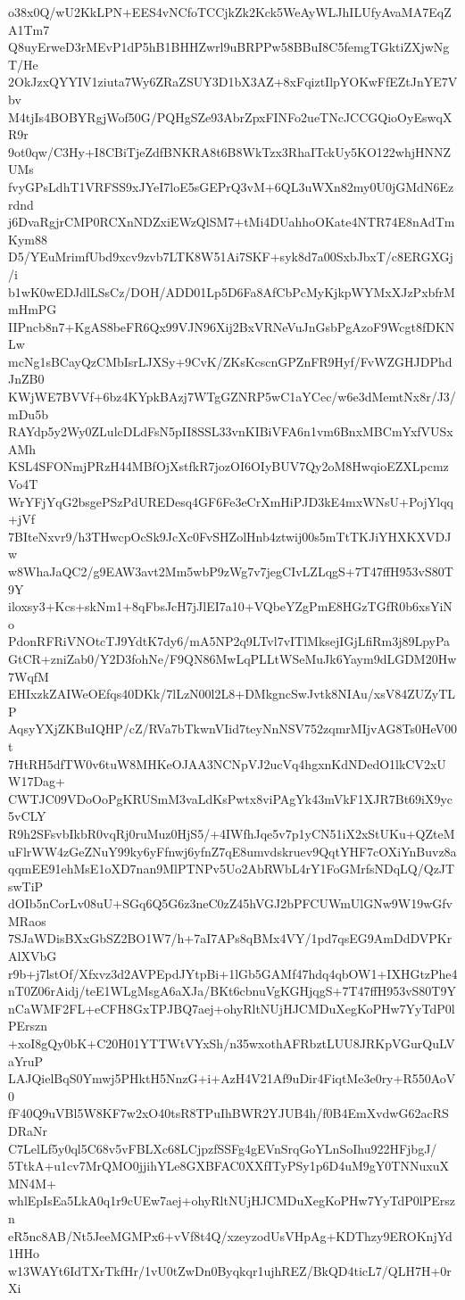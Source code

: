 o38x0Q/wU2KkLPN+EES4vNCfoTCCjkZk2Kck5WeAyWLJhILUfyAvaMA7EqZA1Tm7
Q8uyErweD3rMEvP1dP5hB1BHHZwrl9uBRPPw58BBuI8C5femgTGktiZXjwNgT/He
2OkJzxQYYIV1ziuta7Wy6ZRaZSUY3D1bX3AZ+8xFqiztIlpYOKwFfEZtJnYE7Vbv
M4tjIs4BOBYRgjWof50G/PQHgSZe93AbrZpxFINFo2ueTNcJCCGQioOyEswqXR9r
9ot0qw/C3Hy+I8CBiTjeZdfBNKRA8t6B8WkTzx3RhaITckUy5KO122whjHNNZUMs
fvyGPsLdhT1VRFSS9xJYeI7loE5sGEPrQ3vM+6QL3uWXn82my0U0jGMdN6Ezrdnd
j6DvaRgjrCMP0RCXnNDZxiEWzQlSM7+tMi4DUahhoOKate4NTR74E8nAdTmKym88
D5/YEuMrimfUbd9xcv9zvb7LTK8W51Ai7SKF+syk8d7a00SxbJbxT/c8ERGXGj/i
b1wK0wEDJdlLSsCz/DOH/ADD01Lp5D6Fa8AfCbPcMyKjkpWYMxXJzPxbfrMmHmPG
IIPncb8n7+KgAS8beFR6Qx99VJN96Xij2BxVRNeVuJnGsbPgAzoF9Wcgt8fDKNLw
mcNg1sBCayQzCMbIsrLJXSy+9CvK/ZKsKcscnGPZnFR9Hyf/FvWZGHJDPhdJnZB0
KWjWE7BVVf+6bz4KYpkBAzj7WTgGZNRP5wC1aYCec/w6e3dMemtNx8r/J3/mDu5b
RAYdp5y2Wy0ZLulcDLdFsN5pII8SSL33vnKIBiVFA6n1vm6BnxMBCmYxfVUSxAMh
KSL4SFONmjPRzH44MBfOjXstfkR7jozOI6OIyBUV7Qy2oM8HwqioEZXLpcmzVo4T
WrYFjYqG2bsgePSzPdUREDesq4GF6Fe3eCrXmHiPJD3kE4mxWNsU+PojYlqq+jVf
7BIteNxvr9/h3THwcpOcSk9JcXc0FvSHZolHnb4ztwij00s5mTtTKJiYHXKXVDJw
w8WhaJaQC2/g9EAW3avt2Mm5wbP9zWg7v7jegCIvLZLqgS+7T47ffH953vS80T9Y
iloxsy3+Kcs+skNm1+8qFbsJcH7jJlEI7a10+VQbeYZgPmE8HGzTGfR0b6xsYiNo
PdonRFRiVNOtcTJ9YdtK7dy6/mA5NP2q9LTvl7vITlMksejIGjLfiRm3j89LpyPa
GtCR+zniZab0/Y2D3fohNe/F9QN86MwLqPLLtWSeMuJk6Yaym9dLGDM20Hw7WqfM
EHIxzkZAIWeOEfqs40DKk/7lLzN00l2L8+DMkgncSwJvtk8NIAu/xsV84ZUZyTLP
AqsyYXjZKBuIQHP/cZ/RVa7bTkwnVIid7teyNnNSV752zqmrMIjvAG8Ts0HeV00t
7HtRH5dfTW0v6tuW8MHKeOJAA3NCNpVJ2ucVq4hgxnKdNDedO1lkCV2xUW17Dag+
CWTJC09VDoOoPgKRUSmM3vaLdKsPwtx8viPAgYk43mVkF1XJR7Bt69iX9yc5vCLY
R9h2SFsvbIkbR0vqRj0ruMuz0HjS5/+4IWfhJqe5v7p1yCN51iX2xStUKu+QZteM
uFlrWW4zGeZNuY99ky6yFfnwj6yfnZ7qE8umvdskruev9QqtYHF7cOXiYnBuvz8a
qqmEE91ehMsE1oXD7nan9MlPTNPv5Uo2AbRWbL4rY1FoGMrfsNDqLQ/QzJTswTiP
dOIb5nCorLv08uU+SGq6Q5G6z3neC0zZ45hVGJ2bPFCUWmUlGNw9W19wGfvMRaos
7SJaWDisBXxGbSZ2BO1W7/h+7aI7APs8qBMx4VY/1pd7qsEG9AmDdDVPKrAlXVbG
r9b+j7lstOf/Xfxvz3d2AVPEpdJYtpBi+1lGb5GAMf47hdq4qbOW1+IXHGtzPhe4
nT0Z06rAidj/teE1WLgMsgA6aXJa/BKt6cbnuVgKGHjqgS+7T47ffH953vS80T9Y
nCaWMF2FL+eCFH8GxTPJBQ7aej+ohyRltNUjHJCMDuXegKoPHw7YyTdP0lPErszn
+xoI8gQy0bK+C20H01YTTWtVYxSh/n35wxothAFRbztLUU8JRKpVGurQuLVaYruP
LAJQielBqS0Ymwj5PHktH5NnzG+i+AzH4V21Af9uDir4FiqtMe3e0ry+R550AoV0
fF40Q9uVBl5W8KF7w2xO40tsR8TPuIhBWR2YJUB4h/f0B4EmXvdwG62acRSDRaNr
C7LelLf5y0ql5C68v5vFBLXc68LCjpzfSSFg4gEVnSrqGoYLnSoIhu922HFjbgJ/
5TtkA+u1cv7MrQMO0jjihYLe8GXBFAC0XXfITyPSy1p6D4uM9gY0TNNuxuXMN4M+
whlEpIsEa5LkA0q1r9cUEw7aej+ohyRltNUjHJCMDuXegKoPHw7YyTdP0lPErszn
eR5nc8AB/Nt5JeeMGMPx6+vVf8t4Q/xzeyzodUsVHpAg+KDThzy9EROKnjYd1HHo
w13WAYt6IdTXrTkfHr/1vU0tZwDn0Byqkqr1ujhREZ/BkQD4ticL7/QLH7H+0rXi
